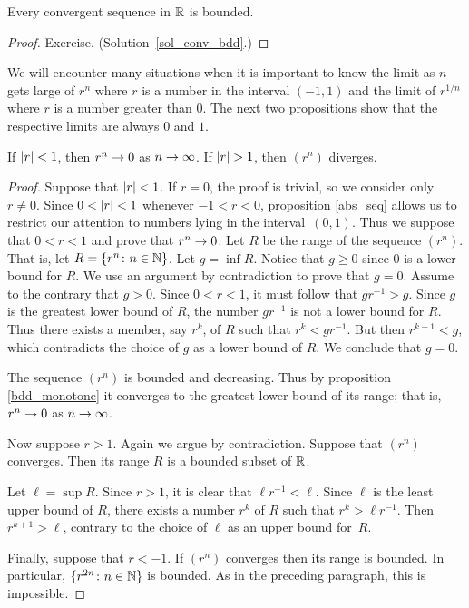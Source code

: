 \begin{prop}\label{conv_bdd} Every convergent sequence in $\mathbb{R}$ is bounded.
\end{prop}

\begin{proof} Exercise.  (Solution~\ref{sol_conv_bdd}.)  \ns \end{proof}

We will encounter many situations when it is important to know the limit as $n$ gets large of
$r^n$ where $r$ is a number in the interval $(-1,1)$ and the limit of $r^{1/n}$ where $r$ is a
number greater than $0$.  The next two propositions show that the respective limits are always
$0$ and $1$.

\begin{prop}\label{prop_lim_pwrs} If $\lvert r\rvert < 1$, then $r^n \rightarrow 0$ as $n \rightarrow \infty$.
If $\lvert r\rvert > 1$, then $(r^n)$ diverges.
\end{prop}

\begin{proof} Suppose that $\lvert r\rvert < 1$. If $r=0$, the proof is trivial, so we consider
only $r \ne 0$.  Since $0 < \lvert r\rvert < 1$ whenever $-1 < r < 0$, proposition \ref{abs_seq}
allows us to restrict our attention to numbers lying in the interval~$(0,1)$. Thus we suppose
that $0 < r < 1$ and prove that $r^n \rightarrow 0$.  Let $R$ be the range of the sequence $(r^n)$.
That is, let $R = \{r^n \colon n \in \mathbb{N}\}$.  Let $g = \inf R$. Notice that $g \ge 0$ since $0$
is a lower bound for $R$.  We use an argument by contradiction to prove that $g=0$. Assume to
the contrary that $g > 0$.  Since $0 < r < 1$, it must follow that $gr^{-1} > g$.  Since $g$
is the greatest lower bound of $R$, the number $gr^{-1}$ is not a lower bound for $R$. Thus
there exists a member, say $r^k$, of $R$ such that $r^k < gr^{-1}$. But then $r^{k+1} < g$,
which contradicts the choice of $g$ as a lower bound of $R$.  We conclude that $g = 0$.

The sequence $(r^n)$ is bounded and decreasing.  Thus by proposition \ref{bdd_monotone} it
converges to the greatest lower bound of its range; that is, $r^n \rightarrow 0$ as $n \rightarrow \infty$.

Now suppose $r>1$.  Again we argue by contradiction.  Suppose that $(r^n)$ converges.  Then
its range $R$ is a bounded subset of $\mathbb{R}$.

Let $\ell = \sup R$.  Since $r>1$, it is clear that $\ell r^{-1} < \ell$.  Since $\ell$ is the
least upper bound of $R$, there exists a number $r^k$ of $R$ such that $r^k > \ell r^{-1}$.
Then $r^{k+1} > \ell$, contrary to the choice of $\ell$ as an upper bound for~$R$.

Finally, suppose that $r<-1$.  If $(r^n)$ converges then its range is bounded.  In particular,
$\{r^{2n}\colon n \in \mathbb{N}\}$ is bounded.  As in the preceding paragraph, this is impossible.
\end{proof}

